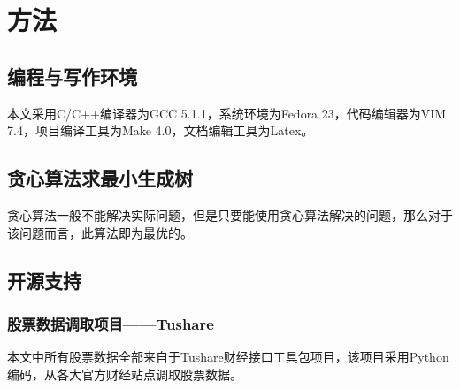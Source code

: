 \section{方法}
\subsection{编程与写作环境}
本文采用C/C++编译器为GCC 5.1.1，系统环境为Fedora 23，代码编辑器为VIM 7.4，项目编译工具为Make 4.0，文档编辑工具为Latex。
\subsection{贪心算法求最小生成树}
贪心算法一般不能解决实际问题，但是只要能使用贪心算法解决的问题，那么对于该问题而言，此算法即为最优的。
\subsection{开源支持}
\subsubsection{股票数据调取项目——Tushare}
本文中所有股票数据全部来自于Tushare财经接口工具包项目，该项目采用Python编码，从各大官方财经站点调取股票数据。
